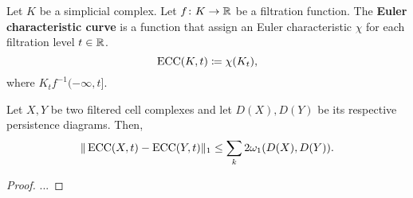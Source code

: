 \begin{definition}
    Let $ K $ be a simplicial complex. Let $ f \colon K \to \mathbb R $ be a filtration function. The {\bf Euler characteristic curve} is a function that assign an Euler characteristic $ \chi $ for each filtration level $ t \in \mathbb R $. 
    \begin{equation}
        \operatorname{ECC}(K, t) \coloneq \chi(K_t),
    \end{equation}
    where $ K_t f^{-1} (-\infty, t] $.
\end{definition}

\begin{proposition}
    Let $ X, Y $ be two filtered cell complexes and let $ D(X), D(Y) $ be its respective persistence diagrams. Then,
    \begin{equation}
        \| \operatorname{ECC}(X, t) - \operatorname{ECC}(Y, t) \|_1 \leq \sum_k 2 \omega_1(D(X), D(Y)).
    \end{equation}
\end{proposition}
\begin{proof}
    ...
\end{proof}
